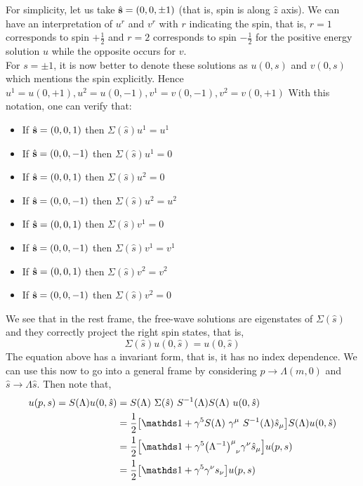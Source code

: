 For simplicity, let us take $\hat{\vb{s}} = (0,0,\pm 1)$ (that is, spin is along $\hat{z}$ axis). We can have an interpretation of $u^r$ and $v^r$ with $r$ indicating the spin, that is, $r=1$ corresponds to spin $+\frac{1}{2}$ and $r=2$ corresponds to spin $-\frac{1}{2}$ for the positive energy solution $u$ while the opposite occurs for $v$.\\[0.2cm] For $s=\pm 1$, it is now better to denote these solutions as $u(0,s)$ and $v(0,s)$ which mentions the spin explicitly. Hence $u^1 = u(0,+1), u^2 = u(0,-1), v^1 = v(0,-1), v^2 = v(0,+1)$
With this notation, one can verify that:\\
\begin{center}
    \begin{minipage}{0.48\textwidth}
    \begin{itemize}
    \item If $\hat{\vb{s}} = (0,0,1)$ then $\Sigma(\hat{s}) u^1 = u^1$
     \item If $\hat{\vb{s}} = (0,0,-1)$ then $\Sigma(\hat{s}) u^1 = 0$
      \item If $\hat{\vb{s}} = (0,0,1)$ then $\Sigma(\hat{s}) u^2 = 0$
     \item If $\hat{\vb{s}} = (0,0,-1)$ then $\Sigma(\hat{s}) u^2 = u^2$
\end{itemize}
\end{minipage}%
\begin{minipage}{0.48\textwidth}
    \begin{itemize}
    \item If $\hat{\vb{s}} = (0,0,1)$ then $\Sigma(\hat{s}) v^1 = 0$
     \item If $\hat{\vb{s}} = (0,0,-1)$ then $\Sigma(\hat{s}) v^1 = v^1$
      \item If $\hat{\vb{s}} = (0,0,1)$ then $\Sigma(\hat{s}) v^2 = v^2$
     \item If $\hat{\vb{s}} = (0,0,-1)$ then $\Sigma(\hat{s}) v^2 = 0$
\end{itemize}
\end{minipage}
\end{center}
We see that in the rest frame, the free-wave solutions are eigenstates of $\Sigma(\hat{s})$ and they correctly project the right spin states, that is, $$\Sigma(\hat{s}) u(0,\hat{s}) = u(0,\hat{s})$$
The equation above has a invariant form, that is, it has no index dependence. We can use this now to go into a general frame by considering $p\to \Lambda (m,0)$ and $\hat{s}\to \Lambda \hat{s}$. Then note that,
\begin{align*}
  u(p,s)= S(\Lambda)u(0,\hat{s})&= S(\Lambda)\ \Sigma(\hat{s})\ S^{-1}(\Lambda)S(\Lambda)\ u(0,\hat{s}) \\
    &= \frac{1}{2}\qty[\iden+\gamma^5 S(\Lambda)\ \gamma^\mu\ S^{-1}(\Lambda) \hat{s}_\mu] S(\Lambda) u(0,\hat{s})\\
    &=\frac{1}{2}\qty[\iden +\gamma^5 \itrmat{\mu}{\nu}\gamma^\nu  \hat{s}_\mu] u(p,s)\\
    &=\frac{1}{2}\qty[\iden +\gamma^5 \gamma^\nu  s_\nu] u(p,s)
\end{align*}
